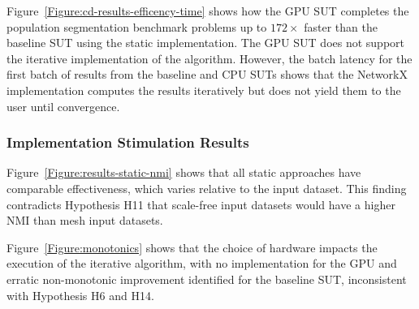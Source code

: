 Figure~\ref{Figure:cd-results-efficency-time} shows how the \ac{GPU} \ac{SUT} completes the \gai population segmentation benchmark problems up to $172\times$ faster than the baseline \ac{SUT} using the static implementation. 
The \ac{GPU} \ac{SUT} does not support the iterative implementation of the algorithm. 
However, the batch latency for the first batch of results from the baseline and CPU \ac{SUT}s shows that the NetworkX implementation computes the results iteratively but does not yield them to the user until convergence. 



\subsubsection{Implementation Stimulation Results}
Figure~\ref{Figure:results-static-nmi} shows that all static approaches have comparable effectiveness, which varies relative to the input dataset.
This finding contradicts Hypothesis H11 that scale-free input datasets would have a higher \ac{NMI} than mesh input datasets.

Figure~\ref{Figure:monotonics} shows that the choice of hardware impacts the execution of the iterative algorithm, with no implementation for the \ac{GPU} and erratic non-monotonic improvement identified for the baseline \ac{SUT}, inconsistent with Hypothesis H6 and H14.




% 

% 


